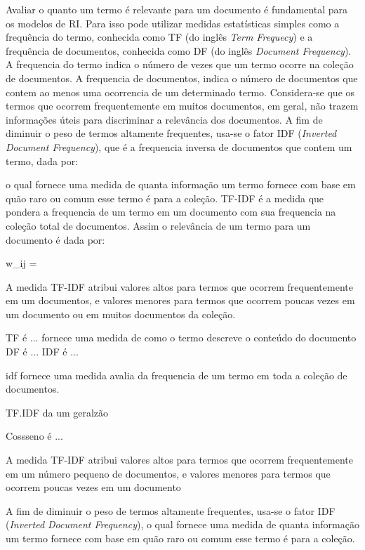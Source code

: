 

Avaliar o quanto um termo é relevante para um documento é fundamental para os modelos de RI. 
Para isso pode utilizar medidas estatísticas simples como a frequência do termo, conhecida como TF (do inglês \textit{Term Frequecy}) e a frequência de documentos, conhecida como DF (do inglês \textit{Document Frequency}). 
A frequencia do termo indica o número de vezes que um termo ocorre na coleção de documentos. A frequencia de documentos, indica o número de documentos que contem ao menos uma ocorrencia de um determinado termo. Considera-se que os termos que ocorrem frequentemente em muitos documentos, em geral, não trazem informações úteis para discriminar a relevância dos documentos. 
A fim de diminuir o peso de termos altamente frequentes, usa-se o fator IDF (\textit{Inverted Document Frequency}), que é a frequencia inversa de documentos que contem um termo, dada por:

o qual fornece uma medida de quanta informação um termo fornece com base em quão raro ou comum esse termo é para a coleção. TF-IDF é a medida que pondera a frequencia de um termo em um documento com sua frequencia na coleção total de documentos. Assim o relevância de um termo para um documento é dada por:

w_ij = 

A medida TF-IDF atribui valores 
altos para termos que ocorrem frequentemente em um documentos, e valores 
menores para termos que ocorrem poucas vezes em um documento ou em muitos documentos da coleção.






TF é ... fornece uma medida de como o termo descreve o conteúdo do documento
DF é ... 
IDF é ... 

idf fornece uma medida avalia da frequencia de um termo em toda a coleção de documentos.

TF.IDF da um geralzão



Cossseno é ... 


A medida TF-IDF atribui valores altos para termos que ocorrem frequentemente em um número pequeno de documentos, e valores menores para termos que ocorrem poucas vezes em um documento

A fim de diminuir o peso de termos altamente frequentes, usa-se o fator IDF (\textit{Inverted Document Frequency}), o qual fornece uma medida de quanta informação um termo fornece com base em quão raro ou comum esse termo é para a coleção.

